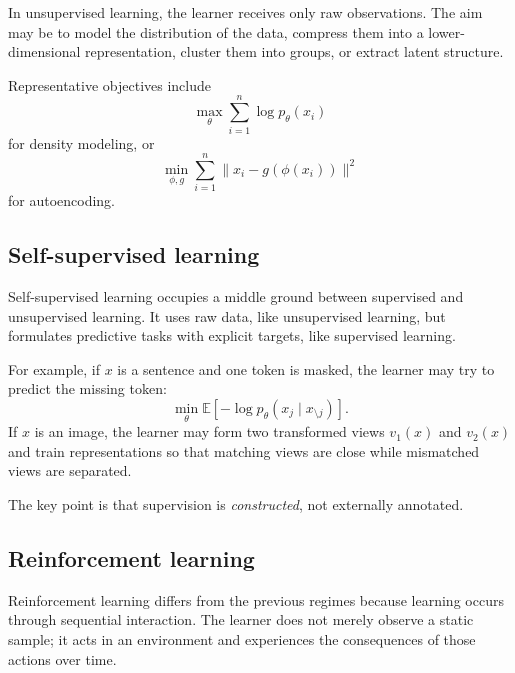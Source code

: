 In unsupervised learning, the learner receives only raw observations. The aim may be to model the distribution of the data, compress them into a lower-dimensional representation, cluster them into groups, or extract latent structure.

Representative objectives include
\[
\max_\theta \sum_{i=1}^n \log p_\theta(x_i)
\]
for density modeling, or
\[
\min_{\phi,g} \sum_{i=1}^n \|x_i-g(\phi(x_i))\|^2
\]
for autoencoding.


\subsection*{Self-supervised learning}

Self-supervised learning occupies a middle ground between supervised and unsupervised learning. It uses raw data, like unsupervised learning, but formulates predictive tasks with explicit targets, like supervised learning.

For example, if $x$ is a sentence and one token is masked, the learner may try to predict the missing token:
\[
\min_\theta \mathbb E[-\log p_\theta(x_j \mid x_{\setminus j})].
\]
If $x$ is an image, the learner may form two transformed views $v_1(x)$ and $v_2(x)$ and train representations so that matching views are close while mismatched views are separated.

The key point is that supervision is \emph{constructed}, not externally annotated.


\subsection*{Reinforcement learning}

Reinforcement learning differs from the previous regimes because learning occurs through sequential interaction. The learner does not merely observe a static sample; it acts in an environment and experiences the consequences of those actions over time.


